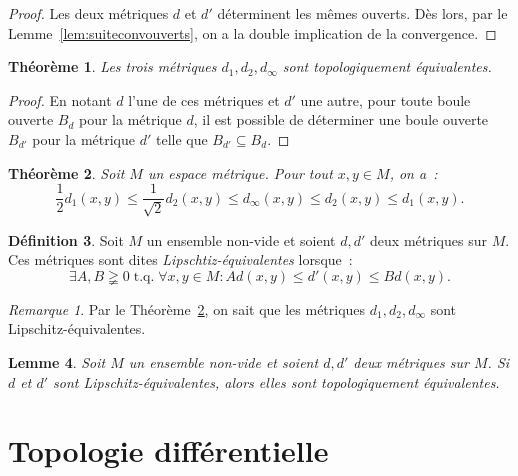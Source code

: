 \documentclass{report}
\newtheorem{thm}{Théorème}[section]
\newtheorem{lem}[thm]{Lemme}
\theoremstyle{definition}
\newtheorem{déf}[thm]{Définition}
\theoremstyle{remark}
\newtheorem*{rmq}{Remarque}
\DeclareMathOperator{\tq}{\text{ t.q. }}
\begin{document}
		\begin{proof} Les deux métriques $d$ et $d'$ déterminent les mêmes ouverts. Dès lors, par le Lemme~\ref{lem:suiteconvouverts}, on a la double implication
		de la convergence.
		\end{proof}

		\begin{thm} Les trois métriques $d_1, d_2, d_\infty$ sont topologiquement équivalentes.
		\end{thm}

		\begin{proof} En notant $d$ l'une de ces métriques et $d'$ une autre, pour toute boule ouverte $B_d$ pour la métrique $d$, il est possible de déterminer une
		boule ouverte $B_{d'}$ pour la métrique $d'$ telle que $B_{d'} \subseteq B_d$.
		\end{proof}

		\begin{thm}\label{thm:d1d2dinflipschitzeq} Soit $M$ un espace métrique. Pour tout $x, y \in M$, on a~:
		\[\frac 12 d_1(x, y) \leq \frac 1{\sqrt 2}d_2(x, y) \leq d_\infty(x, y) \leq d_2(x, y) \leq d_1(x, y).\]
		\end{thm}

		\begin{déf} Soit $M$ un ensemble non-vide et soient $d, d'$ deux métriques sur $M$. Ces métriques sont dites \textit{Lipschtiz-équivalentes} lorsque~:
		\[\exists A, B \gneqq 0 \tq \forall x, y \in M : Ad(x, y) \leq d'(x, y) \leq Bd(x, y).\]
		\end{déf}

		\begin{rmq} Par le Théorème~\ref{thm:d1d2dinflipschitzeq}, on sait que les métriques $d_1, d_2, d_\infty$ sont Lipschitz-équivalentes.
		\end{rmq}

		\begin{lem} Soit $M$ un ensemble non-vide et soient $d, d'$ deux métriques sur $M$. Si $d$ et $d'$ sont Lipschitz-équivalentes, alors elles sont topologiquement
		équivalentes.
		\end{lem}

\chapter{Topologie différentielle}
\end{document}
